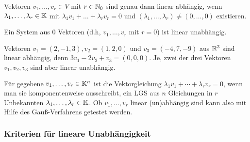 	Vektoren $ v_1, \ldots, v_r \in V $ mit $ r \in \mathbb N_0 $ sind genau dann linear abhängig, wenn $ \lambda_1, \ldots, \lambda_r \in \mathbb K$ mit $ \lambda_1v_1 + \ldots + \lambda_rv_r = 0 $ und $ ( \lambda_1, \ldots, \lambda_r ) \neq ( 0, \ldots, 0 ) $ existieren.

	Ein System aus  $0$ Vektoren (d.h, $v_1,\ldots,v_r$ mit $r=0$) ist linear unabhängig.
	
\begin{bsp}
	Vektoren $v_1= (2,-1,3), v_2 = (1,2,0)$ und $v_3 = (-4,7,-9)$ aus $\mathbb R^3$ sind linear abhängig, denn $ 3 v_1 - 2 v_2 + v_3 = (0,0,0)$. Je, zwei der drei Vektoren $v_1, v_2, v_3$ sind aber linear unabhängig. 
\end{bsp} 

\begin{bem}
	Für gegebene $v_1,\ldots,v_r \in \mathbb K^n$ ist die Vektorgleichung $\lambda_1 v_1 + \cdots + \lambda_r v_r = 0$, wenn man sie komponentenweise ausschreibt, ein LGS aus $n$ Gleichungen in $r$ Unbekannten $\lambda_1,\ldots,\lambda_r \in \mathbb K$. Ob $v_1,\ldots,v_r$ linear (un)abhängig sind kann also mit Hilfe des Gauß-Verfahrens getestet werden. 
\end{bem} 


\subsubsection{Kriterien für lineare Unabhängigkeit}

